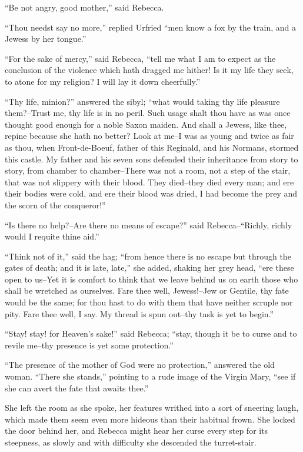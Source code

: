 ``Be not angry, good mother,'' said Rebecca.

``Thou needst say no more,'' replied Urfried ``men know a fox by the
train, and a Jewess by her tongue.''

``For the sake of mercy,'' said Rebecca, ``tell me what I am to expect
as the conclusion of the violence which hath dragged me hither! Is it my
life they seek, to atone for my religion? I will lay it down
cheerfully.''

``Thy life, minion?'' answered the sibyl; ``what would taking thy life
pleasure them?--Trust me, thy life is in no peril. Such usage shalt thou
have as was once thought good enough for a noble Saxon maiden. And shall
a Jewess, like thee, repine because she hath no better? Look at me--I
was as young and twice as fair as thou, when Front-de-Boeuf, father of
this Reginald, and his Normans, stormed this castle. My father and his
seven sons defended their inheritance from story to story, from chamber
to chamber--There was not a room, not a step of the stair, that was not
slippery with their blood. They died--they died every man; and ere their
bodies were cold, and ere their blood was dried, I had become the prey
and the scorn of the conqueror!''

``Is there no help?--Are there no means of escape?'' said
Rebecca--``Richly, richly would I requite thine aid.''

``Think not of it,'' said the hag; ``from hence there is no escape but
through the gates of death; and it is late, late,'' she added, shaking
her grey head, ``ere these open to us--Yet it is comfort to think that
we leave behind us on earth those who shall be wretched as ourselves.
Fare thee well, Jewess!--Jew or Gentile, thy fate would be the same; for
thou hast to do with them that have neither scruple nor pity. Fare thee
well, I say. My thread is spun out--thy task is yet to begin.''

``Stay! stay! for Heaven's sake!'' said Rebecca; ``stay, though it be to
curse and to revile me--thy presence is yet some protection.''

``The presence of the mother of God were no protection,'' answered the
old woman. ``There she stands,'' pointing to a rude image of the Virgin
Mary, ``see if she can avert the fate that awaits thee.''

She left the room as she spoke, her features writhed into a sort of
sneering laugh, which made them seem even more hideous than their
habitual frown. She locked the door behind her, and Rebecca might hear
her curse every step for its steepness, as slowly and with difficulty
she descended the turret-stair.

